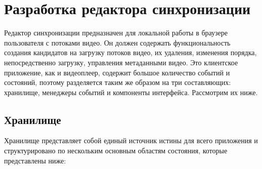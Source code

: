 	\section{Разработка редактора синхронизации}
	
	Редактор синхронизации предназначен для локальной работы в браузере пользователя с потоками видео. Он должен содержать функциональность создания кандидатов на загрузку потоков видео, их удаления, изменения порядка, непосредственно загрузку, управления метаданными видео. Это клиентское приложение, как и видеоплеер, содержит большое количество событий и состояний, поэтому разделяется таким же образом на три составляющих: хранилище, менеджеры событий и компоненты интерфейса. Рассмотрим их ниже.
	
	\subsection{Хранилище}
	
	Хранилище представляет собой единый источник истины для всего приложения и структурировано по нескольким основным областям состояния, которые представлены ниже:
	
